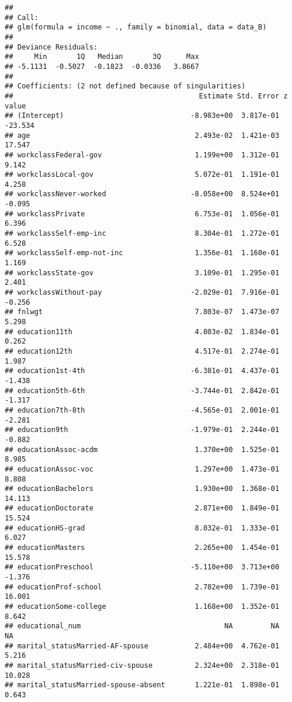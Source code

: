\documentclass[]{article}
\begin{document}
\begin{verbatim}
## 
## Call:
## glm(formula = income ~ ., family = binomial, data = data_B)
## 
## Deviance Residuals: 
##     Min       1Q   Median       3Q      Max  
## -5.1131  -0.5027  -0.1823  -0.0336   3.8667  
## 
## Coefficients: (2 not defined because of singularities)
##                                            Estimate Std. Error z value
## (Intercept)                              -8.983e+00  3.817e-01 -23.534
## age                                       2.493e-02  1.421e-03  17.547
## workclassFederal-gov                      1.199e+00  1.312e-01   9.142
## workclassLocal-gov                        5.072e-01  1.191e-01   4.258
## workclassNever-worked                    -8.058e+00  8.524e+01  -0.095
## workclassPrivate                          6.753e-01  1.056e-01   6.396
## workclassSelf-emp-inc                     8.304e-01  1.272e-01   6.528
## workclassSelf-emp-not-inc                 1.356e-01  1.160e-01   1.169
## workclassState-gov                        3.109e-01  1.295e-01   2.401
## workclassWithout-pay                     -2.029e-01  7.916e-01  -0.256
## fnlwgt                                    7.803e-07  1.473e-07   5.298
## education11th                             4.803e-02  1.834e-01   0.262
## education12th                             4.517e-01  2.274e-01   1.987
## education1st-4th                         -6.381e-01  4.437e-01  -1.438
## education5th-6th                         -3.744e-01  2.842e-01  -1.317
## education7th-8th                         -4.565e-01  2.001e-01  -2.281
## education9th                             -1.979e-01  2.244e-01  -0.882
## educationAssoc-acdm                       1.370e+00  1.525e-01   8.985
## educationAssoc-voc                        1.297e+00  1.473e-01   8.808
## educationBachelors                        1.930e+00  1.368e-01  14.113
## educationDoctorate                        2.871e+00  1.849e-01  15.524
## educationHS-grad                          8.032e-01  1.333e-01   6.027
## educationMasters                          2.265e+00  1.454e-01  15.578
## educationPreschool                       -5.110e+00  3.713e+00  -1.376
## educationProf-school                      2.782e+00  1.739e-01  16.001
## educationSome-college                     1.168e+00  1.352e-01   8.642
## educational_num                                  NA         NA      NA
## marital_statusMarried-AF-spouse           2.484e+00  4.762e-01   5.216
## marital_statusMarried-civ-spouse          2.324e+00  2.318e-01  10.028
## marital_statusMarried-spouse-absent       1.221e-01  1.898e-01   0.643

\end{verbatim}
\end{document}
